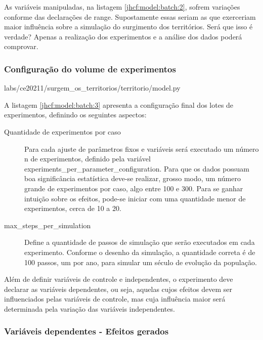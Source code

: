 As variáveis manipuladas, na listagem \ref{jhcf:model:batch:2}, sofrem variações conforme das declarações de range. Supostamente essas seriam as que exerceriam maior influência sobre a simulação do surgimento dos territórios. Será que isso é verdade? Apenas a realização dos experimentos e a análise dos dados poderá comprovar.

\subsubsection{Configuração do volume de experimentos}


{labs/ce20211/surgem_os_territorios/territorio/model.py}

A listagem \ref{jhcf:model:batch:3} apresenta a configuração final dos lotes de experimentos, definindo os seguintes aspectos:
\begin{description}
\item [Quantidade de experimentos por caso] Para cada ajuste de parâmetros fixos e variáveis será executado um número n de experimentos, definido pela variável experiments\_per\_parameter\_configuration. Para que os dados possuam boa significância estatística deve-se realizar, grosso modo, um número grande de experimentos por caso, algo entre 100 e 300. Para se ganhar intuição sobre os efeitos, pode-se iniciar com uma quantidade menor de experimentos, cerca de 10 a 20.
\item [max\_steps\_per\_simulation] Define a quantidade de passos de simulação que serão executados em cada experimento. Conforme o desenho da simulação, a quantidade correta é de 100 passos, um por ano, para simular um século de evolução da população.
\end{description}

Além de definir variáveis de controle e independentes, o experimento deve declarar as variáveis dependentes, ou seja, aquelas cujos efeitos devem ser influenciados pelas variáveis de controle, mas cuja influência maior será determinada pela variação das variáveis independentes.

\subsubsection{Variáveis dependentes - Efeitos gerados}

